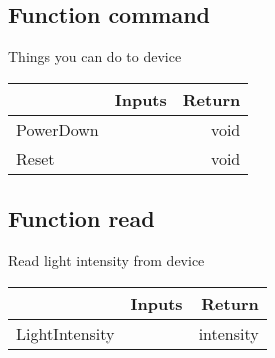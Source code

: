 \documentclass[a4paper,12pt,oneside,pdflatex,italian,final,twocolumn]{article}
\begin{document}
\raggedright
\subsection{Function command }
Things you can do to device \\

\centering
\begin{tabular}{lcr}
\toprule
  & Inputs & Return \\
\midrule
PowerDown &
&
void
\\
Reset &
&
void
\\
\bottomrule
\end{tabular}



\raggedright
\subsection{Function read }
Read light intensity from device \\

\centering
\begin{tabular}{lcr}
\toprule
  & Inputs & Return \\
\midrule
LightIntensity &
&
intensity
\\
\bottomrule
\end{tabular}



\raggedright
\end{document}

